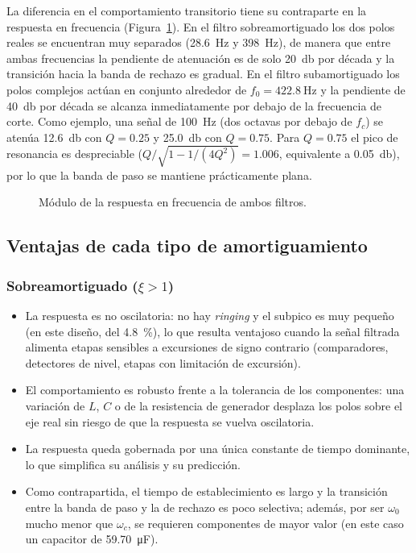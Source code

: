La diferencia en el comportamiento transitorio tiene su contraparte en la respuesta en frecuencia
(Figura~\ref{fig:bode-comparacion}). En el filtro sobreamortiguado los dos polos reales se encuentran muy
separados (\qty{28.6}{\hertz} y \qty{398}{\hertz}), de manera que entre ambas frecuencias la pendiente de
atenuación es de solo \qty{20}{\decibel} por década y la transición hacia la banda de rechazo es gradual.
En el filtro subamortiguado los polos complejos actúan en conjunto alrededor de $f_0 = \qty{422.8}{\hertz}$ y
la pendiente de \qty{40}{\decibel} por década se alcanza inmediatamente por debajo de la frecuencia de corte.
Como ejemplo, una señal de \qty{100}{\hertz} (dos octavas por debajo de $f_c$) se atenúa
\qty{12.6}{\decibel} con $Q = \num{0.25}$ y \qty{25.0}{\decibel} con $Q = \num{0.75}$. Para $Q = \num{0.75}$
el pico de resonancia es despreciable ($Q/\sqrt{1 - 1/(4Q^2)} = \num{1.006}$, equivalente a
\qty{0.05}{\decibel}), por lo que la banda de paso se mantiene prácticamente plana.

\begin{figure}[!ht]
  \centering
  
  \caption{Módulo de la respuesta en frecuencia de ambos filtros.}
  \label{fig:bode-comparacion}
\end{figure}

\subsection{Ventajas de cada tipo de amortiguamiento}

\subsubsection{Sobreamortiguado ($\xi > 1$)}

\begin{itemize}
  \item La respuesta es no oscilatoria: no hay \emph{ringing} y el subpico es muy pequeño (en este diseño,
        del \qty{4.8}{\percent}), lo que resulta ventajoso cuando la señal filtrada alimenta etapas sensibles
        a excursiones de signo contrario (comparadores, detectores de nivel, etapas con limitación de
        excursión).
  \item El comportamiento es robusto frente a la tolerancia de los componentes: una variación de $L$, $C$ o
        de la resistencia de generador desplaza los polos sobre el eje real sin riesgo de que la respuesta
        se vuelva oscilatoria.
  \item La respuesta queda gobernada por una única constante de tiempo dominante, lo que simplifica su
        análisis y su predicción.
  \item Como contrapartida, el tiempo de establecimiento es largo y la transición entre la banda de paso y
        la de rechazo es poco selectiva; además, por ser $\omega_0$ mucho menor que $\omega_c$, se requieren
        componentes de mayor valor (en este caso un capacitor de \qty{59.70}{\micro\farad}).
\end{itemize}

